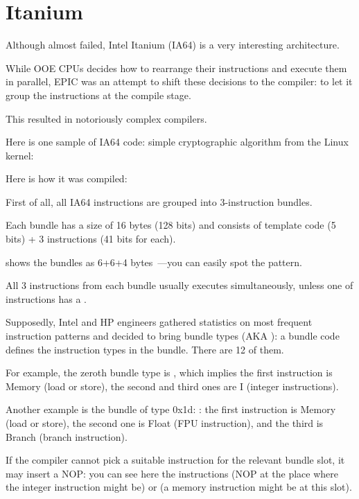 \section{Itanium}
\label{itanium}

Although almost failed, Intel Itanium (\ac{IA64}) is a very interesting architecture.

While \ac{OOE} CPUs decides how to rearrange their instructions and execute them in parallel,
\ac{EPIC} was an attempt to shift these decisions to the compiler:
to let it group the instructions at the compile stage.

This resulted in notoriously complex compilers.

Here is one sample of \ac{IA64} code: simple cryptographic algorithm from the Linux kernel:



Here is how it was compiled:



First of all, all \ac{IA64} instructions are grouped into 3-instruction bundles.

Each bundle has a size of 16 bytes (128 bits) and consists of template code (5 bits) + 3 instructions (41 bits for each).

\IDA shows the bundles as 6+6+4 bytes~---you can easily spot the pattern.

All 3 instructions from each bundle usually executes simultaneously, unless one of instructions has a .

Supposedly, Intel and HP engineers gathered statistics on most frequent instruction patterns and decided to bring
bundle types (\ac{AKA} ): a bundle code defines the instruction types in the bundle.
There are 12 of them.

For example, the zeroth bundle type is , which implies 
the first instruction is Memory (load or store), the second and third ones are I (integer instructions).

Another example is the bundle of type 0x1d: :
the first instruction is Memory (load or store), the second one is Float 
(\ac{FPU} instruction), and the third is Branch (branch instruction).

If the compiler cannot pick a suitable instruction for the relevant bundle slot, it may insert a \ac{NOP}:
you can see here the
 instructions (\ac{NOP} at the place where the integer instruction might be) or  
(a memory instruction might be at this slot).

